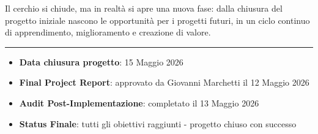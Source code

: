 Il cerchio si chiude, ma in realtà si apre una nuova fase: dalla chiusura del progetto iniziale nascono le opportunità per i progetti futuri, in un ciclo continuo di apprendimento, miglioramento e creazione di valore.

\vspace{1cm}
\noindent\rule{\textwidth}{0.4pt}

\begin{itemize}
    \item[] \textbf{Data chiusura progetto}: 15 Maggio 2026
    \item[] \textbf{Final Project Report}: approvato da Giovanni Marchetti il 12 Maggio 2026
    \item[] \textbf{Audit Post-Implementazione}: completato il 13 Maggio 2026
    \item[] \textbf{Status Finale}: tutti gli obiettivi raggiunti - progetto chiuso con successo
\end{itemize}

